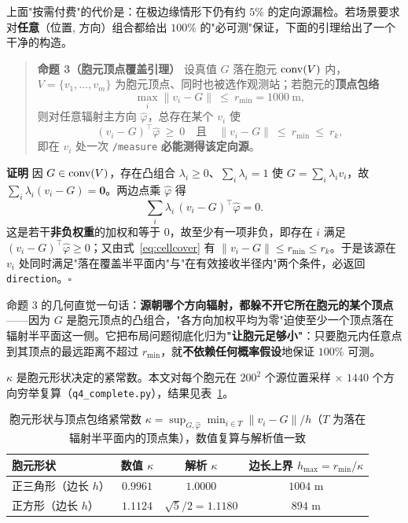 上面"按需付费"的代价是：在极边缘情形下仍有约 $5\%$ 的定向源漏检。若场景要求对\textbf{任意}（位置, 方向）组合都给出 $100\%$ 的"必可测"保证，下面的引理给出了一个干净的构造。

\begin{quote}
\textbf{命题 3（胞元顶点覆盖引理）} 设真值 $G$ 落在胞元 $\operatorname{conv}(V)$ 内，$V=\{v_1,\dots,v_m\}$ 为胞元顶点、同时也被选作观测站；若胞元的\textbf{顶点包络}
\begin{equation}
\max_{i}\|v_i-G\|\ \le\ r_{\min}=1000\ \text{m},
\label{eq:cellcover}
\end{equation}
则对任意辐射主方向 $\hat\varphi$，总存在某个 $v_i$ 使
\begin{equation}
(v_i-G)^{\!\top}\hat\varphi\ \ge\ 0
\quad\text{且}\quad
\|v_i-G\|\ \le\ r_{\min}\ \le\ r_k ,
\label{eq:cellcover2}
\end{equation}
即在 $v_i$ 处一次 \texttt{/measure} \textbf{必能测得该定向源}。
\end{quote}

\noindent\textbf{证明} 因 $G\in\operatorname{conv}(V)$，存在凸组合 $\lambda_i\ge0$、$\sum_i\lambda_i=1$ 使 $G=\sum_i\lambda_i v_i$，故 $\sum_i\lambda_i(v_i-G)=\bm0$。两边点乘 $\hat\varphi$ 得
\[
\sum_i\lambda_i\,(v_i-G)^{\!\top}\hat\varphi=0 .
\]
这是若干\textbf{非负权重}的加权和等于 $0$，故至少有一项非负，即存在 $i$ 满足 $(v_i-G)^{\!\top}\hat\varphi\ge0$；又由式~\eqref{eq:cellcover} 有 $\|v_i-G\|\le r_{\min}\le r_k$。于是该源在 $v_i$ 处同时满足"落在覆盖半平面内"与"在有效接收半径内"两个条件，必返回 \texttt{direction}。$\square$

命题 3 的几何直觉一句话：\textbf{源朝哪个方向辐射，都躲不开它所在胞元的某个顶点}——因为 $G$ 是胞元顶点的凸组合，"各方向加权平均为零"迫使至少一个顶点落在辐射半平面这一侧。它把布局问题彻底化归为\textbf{"让胞元足够小"}：只要胞元内任意点到其顶点的最远距离不超过 $r_{\min}$，就\textbf{不依赖任何概率假设}地保证 $100\%$ 可测。

$\kappa$ 是胞元形状决定的紧常数。本文对每个胞元在 $200^2$ 个源位置采样 $\times$ $1440$ 个方向穷举复算（\texttt{q4\_complete.py}），结果见表~\ref{tab:cell}。

\begin{table}[H]
\centering
\caption{胞元形状与顶点包络紧常数 $\kappa=\sup_{G,\hat\varphi}\min_{i\in T}\|v_i-G\|/h$（$T$ 为落在辐射半平面内的顶点集），数值复算与解析值一致}
\label{tab:cell}
\small
\setlength{\tabcolsep}{5pt}
\begin{tabular}{lccc}
\toprule
胞元形状 & 数值 $\kappa$ & 解析 $\kappa$ & 边长上界 $h_{\max}=r_{\min}/\kappa$ \\
\midrule
正三角形（边长 $h$） & $0.9961$ & $1.0000$ & $1004$ m \\
正方形（边长 $h$）   & $1.1124$ & $\sqrt{5}/2=1.1180$ & $894$ m \\
\bottomrule
\end{tabular}
\end{table}

